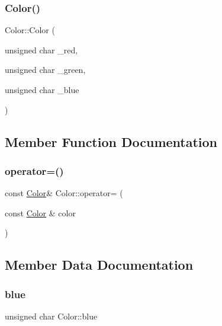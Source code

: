 \mbox{\label{structColor_ad999a91996687a8593bd646ae9a9dbbf}} 
\subsubsection{\texorpdfstring{Color()}{Color()}\hspace{0.1cm}{\footnotesize\ttfamily [2/2]}}
{\footnotesize\ttfamily Color\+::\+Color (\begin{DoxyParamCaption}\item[{unsigned char}]{\+\_\+red,  }\item[{unsigned char}]{\+\_\+green,  }\item[{unsigned char}]{\+\_\+blue }\end{DoxyParamCaption})\hspace{0.3cm}{\ttfamily [inline]}}



\subsection{Member Function Documentation}
\mbox{\label{structColor_ad16157e8a956c472eab89137edde458a}} 
\subsubsection{\texorpdfstring{operator=()}{operator=()}}
{\footnotesize\ttfamily const \hyperlink{structColor}{Color}\& Color\+::operator= (\begin{DoxyParamCaption}\item[{const \hyperlink{structColor}{Color} \&}]{color }\end{DoxyParamCaption})\hspace{0.3cm}{\ttfamily [inline]}}



\subsection{Member Data Documentation}
\mbox{\label{structColor_a5b425af958edb0e7835eb08daeb90e71}} 
\subsubsection{\texorpdfstring{blue}{blue}}
{\footnotesize\ttfamily unsigned char Color\+::blue}

